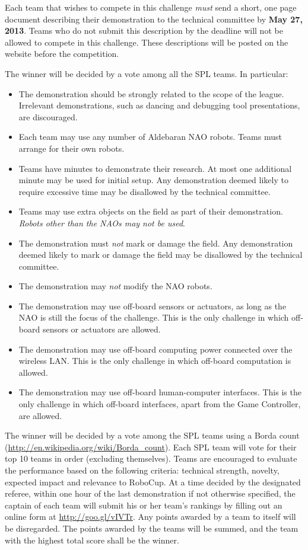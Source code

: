 \documentclass{article}
\begin{document}
Each team that wishes to compete in this challenge \emph{must} send a 
short, one page document describing their demonstration to the technical 
committee by \textbf{May 27, 2013}.  Teams who do not submit this description by 
the deadline will not be allowed to compete in this challenge. These 
descriptions will be posted on the website before the competition.

The winner will be decided by a vote among all the SPL teams. In particular:

\begin{itemize}
\item 
The demonstration should be strongly related to the scope of the league. 
Irrelevant demonstrations, such as dancing and debugging tool presentations, 
are discouraged.
\item 
Each team may use any number of Aldebaran NAO robots. Teams must arrange
for their own robots.
\item 
Teams have \openMinNum{} minutes to demonstrate their research. At most one 
additional minute may be used for initial setup. Any demonstration deemed
likely to require excessive time may be disallowed by the technical
committee.
\item 
Teams may use extra objects on the field as part of their
demonstration. \emph{Robots other than the NAOs may not be used}.
\item 
The demonstration must \emph{not} mark or damage the field. Any
demonstration deemed likely to mark or damage the field may be
disallowed by the technical committee.
\item
The demonstration may \emph{not} modify the NAO robots.
\item 
The demonstration may use off-board sensors or actuators, as long 
as the NAO is still the focus of the challenge.  This is the only 
challenge in which off-board sensors or actuators are allowed.
\item 
The demonstration may use off-board computing power connected over the
wireless LAN. This is the only challenge in which off-board
computation is allowed.
\item 
The demonstration may use off-board human-computer interfaces. This
is the only challenge in which off-board interfaces, apart from the
Game Controller, are allowed.
\end{itemize}

The winner will be decided by a vote among the SPL teams using a Borda
count (\url{http://en.wikipedia.org/wiki/Borda_count}). Each SPL 
team will vote for their top 10 teams in order (excluding themselves).
Teams are encouraged to evaluate the performance based on the
following criteria: technical strength, novelty, expected impact and
relevance to RoboCup. At a time decided by the designated referee,
within one hour of the last demonstration if not otherwise
specified, the captain of each team will submit his or her team's rankings 
by filling out an online form at \url{http://goo.gl/vIVTr}.  Any points 
awarded by a team to itself will be disregarded. The points awarded by the 
teams will be summed, and the team with the highest total score shall be the winner.
\end{document}
